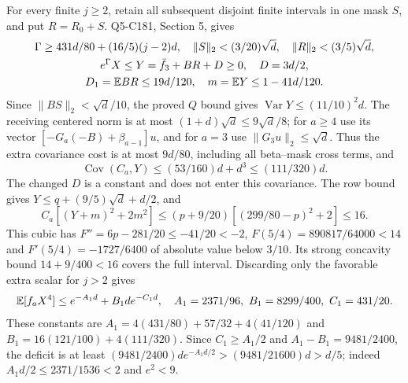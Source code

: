 For every finite $j\ge2$, retain all subsequent disjoint finite
intervals in one mask $S$, and put $R=R_0+S$.
Q5-C181, Section 5, gives
\[
\begin{gathered}
\Gamma\ge431d/80+(16/5)(j-2)d,\quad
\|S\|_2<(3/20)\sqrt d,\quad\|R\|_2<(3/5)\sqrt d,\\
e^\Gamma X\le Y=\bar f_3+BR+D\ge0,\quad D=3d/2,\\
D_1=\mathbb E BR\le19d/120,\quad m=\mathbb E Y\le1-41d/120.
\end{gathered}
\]
Since $\|BS\|_2<\sqrt d/10$, the proved $Q$ bound gives
$\operatorname{Var}Y\le(11/10)^2d$.
The receiving centered norm is at most
$(1+d)\sqrt d\le9\sqrt d/8$; for $a\ge4$ use its vector
$[-G_a(-B)+\beta_{a-1}]u$, and for $a=3$ use $\|G_3u\|_2\le\sqrt d$.
Thus the extra covariance cost is at most $9d/80$, including all
beta--mask cross terms, and
\[
\operatorname{Cov}(C_a,Y)\le(53/160)d+d^3\le(111/320)d.
\]
The changed $D$ is a constant and does not enter this covariance.
The row bound gives $Y\le q+(9/5)\sqrt d+d/2$, and
\[
C_a[(Y+m)^2+2m^2]\le(p+9/20)[(299/80-p)^2+2]\le16.
\]
This cubic has $F''=6p-281/20\le-41/20<-2$,
$F(5/4)=890817/64000<14$ and
$F'(5/4)=-1727/6400$ of absolute value below $3/10$.
Its strong concavity bound $14+9/400<16$ covers the full interval.
Discarding only the favorable extra scalar for $j>2$ gives
\[
\mathbb E[f_aX^4]\le e^{-A_1d}+B_1de^{-C_1d},\quad
A_1=2371/96,\ B_1=8299/400,\ C_1=431/20.
\]
These constants are
$A_1=4(431/80)+57/32+4(41/120)$ and
$B_1=16(121/100)+4(111/320)$.
Since $C_1\ge A_1/2$ and $A_1-B_1=9481/2400$, the deficit is at least
$(9481/2400)de^{-A_1d/2}>(9481/21600)d>d/5$;
indeed $A_1d/2\le2371/1536<2$ and $e^2<9$.

